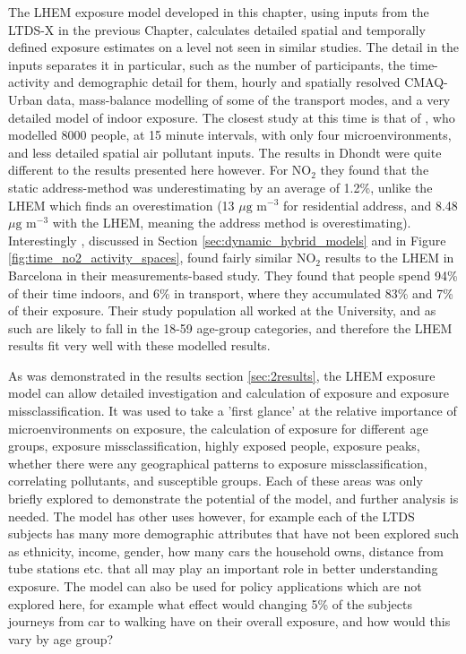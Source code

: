 The LHEM exposure model developed in this chapter, using inputs from the LTDS-X in the previous Chapter, calculates detailed spatial and temporally defined exposure estimates on a level not seen in similar studies. The detail in the inputs separates it in particular, such as the number of participants, the time-activity and demographic detail for them, hourly and spatially resolved CMAQ-Urban data, mass-balance modelling of some of the transport modes, and a very detailed model of indoor exposure. The closest study at this time is that of \cite{Dhondt2012}, who modelled 8000 people, at 15 minute intervals, with only four microenvironments, and less detailed spatial air pollutant inputs. The results in Dhondt were quite different to the results presented here however. For NO$_{2}$ they found that the static address-method was underestimating by an average of 1.2\%, unlike the LHEM which finds an overestimation (13 $\mu \text{g m}^{-3}$ for residential address, and 8.48 $\mu \text{g m}^{-3}$ with the LHEM, meaning the address method is overestimating). Interestingly \cite{DeNazelle2013}, discussed in Section \ref{sec:dynamic_hybrid_models} and in Figure \ref{fig:time_no2_activity_spaces}, found fairly similar NO$_{2}$ results to the LHEM in Barcelona in their measurements-based study. They found that people spend 94\% of their time indoors, and 6\% in transport, where they accumulated 83\% and 7\% of their exposure. Their study population all worked at the University, and as such are likely to fall in the 18-59 age-group categories, and therefore the LHEM results fit very well with these modelled results.

As was demonstrated in the results section \ref{sec:2results}, the LHEM exposure model can allow detailed investigation and calculation of exposure and exposure missclassification. It was used to take a 'first glance' at the relative importance of microenvironments on exposure, the calculation of exposure for different age groups, exposure missclassification, highly exposed people, exposure peaks, whether there were any geographical patterns to exposure missclassification, correlating pollutants, and susceptible groups. Each of these areas was only briefly explored to demonstrate the potential of the model, and further analysis is needed. The model has other uses however, for example each of the LTDS subjects has many more demographic attributes that have not been explored such as ethnicity, income, gender, how many cars the household owns, distance from tube stations etc. that all may play an important role in better understanding exposure. The model can also be used for policy applications which are not explored here, for example what effect would changing 5\% of the subjects journeys from car to walking have on their overall exposure, and how would this vary by age group?

